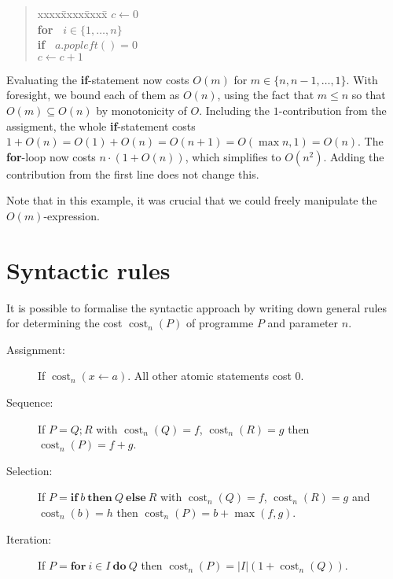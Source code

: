 \documentclass{tstextbook}
\begin{document}
\begin{quotation}
  \begin{tabbing}
    xxxx\=xxxx\=xxxx\=\kill
    $c \leftarrow{} 0$\\
    \textbf{for\ } $i\in \{1,\ldots,n\}$\\
    \> \textbf{if\ } $a.\mathit{popleft}() = 0$\\
    \>\> $c\leftarrow{} c + 1$\\
  \end{tabbing}
\end{quotation}

Evaluating the \textbf{if}-statement now costs $O(m)$ for $m\in \{n, n-1,\ldots, 1\}$.
With foresight, we bound each of them as $O(n)$, using the fact that $ m \leq n$ so that $O( m)\subseteq  O( n)$ by monotonicity of $O$.
Including the $1$-contribution from the assigment, the whole \textbf{if}-statement costs $1+O(n) = O(1) + O(n)= O(n + 1) = O(\max{n, 1})=  O(n)$.
The \textbf{for}-loop now costs $n \cdot (1 + O(n))$, which simplifies to $O(n^2)$.
Adding the contribution from the first line does not change this.

Note that in this example, it was crucial that we could freely manipulate the $O(m)$-expression.

\section{Syntactic rules}

\newcommand{\cost}{\operatorname{cost}}

It is possible to formalise the syntactic approach by writing down general rules for determining the cost  $\cost_n(P)$ of programme $P$ and parameter $n$.

\begin{description}
  \item[Assignment:] If $\cost_n(x\leftarrow a)$. All other atomic statements cost $0$.
  \item[Sequence:] If $P = Q; R$ with $\cost_n(Q) =f$, $\cost_n(R)= g$ then $\cost_n(P)= f + g$.
  \item[Selection:] If $P = \mathbf{if\ } b \mathbf{\ then\ } Q \mathbf{\ else\ } R$ with $\cost_n(Q) =f$, $\cost_n(R)= g$ and $\cost_n(b)= h$ then $\cost_n(P) = b + \max (f, g)$.
  \item[Iteration:] If $P = \mathbf{for\ }i\in I \mathbf{\ do\ }  Q$ then $\cost_n(P) = |I|(1 + \cost_n(Q))$.
\end{description}
\end{document}
